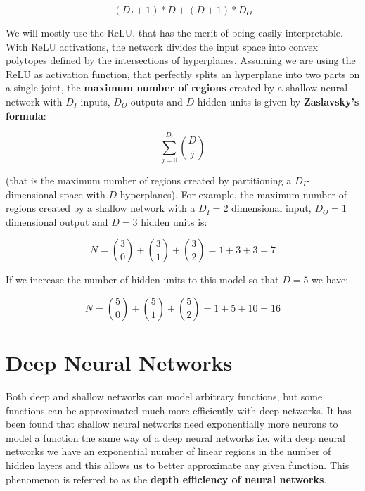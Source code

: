 \documentclass{article}
\begin{document}
\begin{equation*}
    (D_I + 1) * D + (D + 1) * D_O        
\end{equation*}

We will mostly use the ReLU, that has the merit of being easily interpretable. With ReLU activations, the network divides the input space into convex polytopes defined by the intersections of hyperplanes. Assuming we are using the ReLU as activation function, that perfectly splits an hyperplane into two parts on a single joint, the \textbf{maximum number of regions} created by a shallow neural network with $D_I$ inputs, $D_O$ outputs and $D$ hidden units is given by \textbf{Zaslavsky's formula}:

\begin{equation*}
    \sum_{j=0}^{D_i} \binom{D}{j}
\end{equation*}

(that is the maximum number of regions created by partitioning a $D_I$-dimensional space with $D$ hyperplanes). For example, the maximum number of regions created by a shallow network with a $D_I = 2$ dimensional input, $D_O = 1$ dimensional output and $D = 3$ hidden units is:

\begin{equation*}
    N = \binom{3}{0} + \binom{3}{1} + \binom{3}{2} = 1 + 3 + 3 = 7
\end{equation*}

If we increase the number of hidden units to this model so that $D = 5$ we have:

\begin{equation*}
    N = \binom{5}{0} + \binom{5}{1} + \binom{5}{2} = 1 + 5 + 10 = 16
\end{equation*}

\newpage

\section{Deep Neural Networks}

Both deep and shallow networks can model arbitrary functions, but some functions can be approximated much more efficiently with deep networks. It has been found that shallow neural networks need exponentially more neurons to model a function the same way of a deep neural networks i.e. with deep neural networks we have an exponential number of linear regions in the number of hidden layers and this allows us to better approximate any given function. This phenomenon is referred to as the \textbf{depth efficiency of neural networks}.
\end{document}
